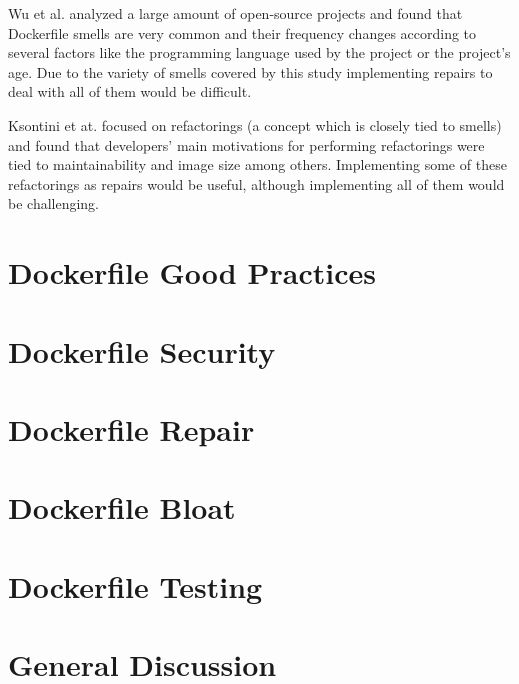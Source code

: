 Wu et al. \cite{wuCharacterizingOccurrenceDockerfile2020} analyzed a large amount of open-source projects and found that Dockerfile smells are very common and their frequency changes according to several factors like the programming language used by the project or the project's age. Due to the variety of smells covered by this study implementing repairs to deal with all of them would be difficult. 

Ksontini et at. \cite{ksontiniRefactoringsTechnicalDebt} focused on refactorings (a concept which is closely tied to smells) and found that developers' main motivations for performing refactorings were tied to maintainability and image size among others. Implementing some of these refactorings as repairs would be useful, although implementing all of them would be challenging.

\section{Dockerfile Good Practices} \label{sec:dockerfile_good_practices}
\section{Dockerfile Security} \label{sec:dockerfile_security}
\section{Dockerfile Repair} \label{sec:dockerfile_repair}
\section{Dockerfile Bloat} \label{sec:dockerfile_bloat}
\section{Dockerfile Testing} \label{sec:dockerfile_testing}




\section{General Discussion} \label{sec:general_discussion}
